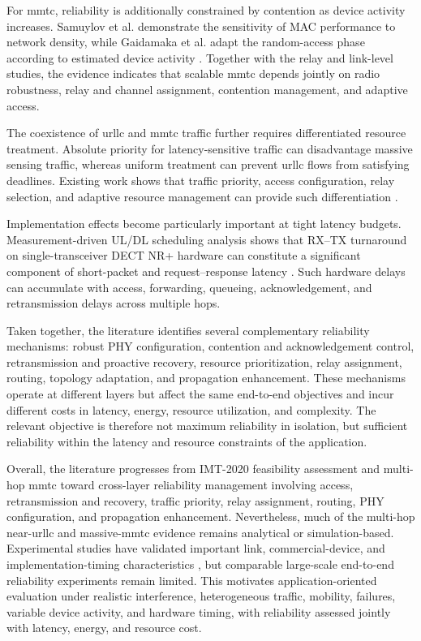 For \gls{mmtc}, reliability is additionally constrained by contention as
device activity increases. Samuylov et al. demonstrate the sensitivity of MAC
performance to network density, while Gaidamaka et al. adapt the random-access
phase according to estimated device activity
\cite{samuylovPerformanceMACLayer2024a,
gaidamakaOptimizingDelaysRandom2025}. Together with the relay and link-level
studies, the evidence indicates that scalable \gls{mmtc} depends jointly on
radio robustness, relay and channel assignment, contention management, and
adaptive access.

The coexistence of \gls{urllc} and \gls{mmtc} traffic further requires
differentiated resource treatment. Absolute priority for latency-sensitive
traffic can disadvantage massive sensing traffic, whereas uniform treatment
can prevent \gls{urllc} flows from satisfying deadlines. Existing work shows
that traffic priority, access configuration, relay selection, and adaptive
resource management can provide such differentiation
\cite{samuylovEmpoweringNearURLLCIoT2025,
glazkovImprovingNearURLLCServices2025,
singhwiDECT2020NewRadio2021}.

Implementation effects become particularly important at tight latency budgets.
Measurement-driven UL/DL scheduling analysis shows that RX--TX turnaround on
single-transceiver DECT NR+ hardware can constitute a significant component of
short-packet and request--response latency
\cite{alizaiMeasurementDrivenLatencyAnalysis2026}. Such hardware delays can
accumulate with access, forwarding, queueing, acknowledgement, and
retransmission delays across multiple hops.

Taken together, the literature identifies several complementary reliability
mechanisms: robust PHY configuration, contention and acknowledgement control,
retransmission and proactive recovery, resource prioritization, relay
assignment, routing, topology adaptation, and propagation enhancement. These
mechanisms operate at different layers but affect the same end-to-end
objectives and incur different costs in latency, energy, resource utilization,
and complexity. The relevant objective is therefore not maximum reliability
in isolation, but sufficient reliability within the latency and resource
constraints of the application.

Overall, the literature progresses from IMT-2020 feasibility assessment and
multi-hop \gls{mmtc} toward cross-layer reliability management involving
access, retransmission and recovery, traffic priority, relay assignment,
routing, PHY configuration, and propagation enhancement. Nevertheless, much
of the multi-hop near-\gls{urllc} and massive-\gls{mmtc} evidence remains
analytical or simulation-based. Experimental studies have validated important
link, commercial-device, and implementation-timing characteristics
\cite{haqueDECT2020NRLink2025,
bandaraExperimentalValidationAnalysis2025,
grafParetoOptimalityApproach2026a,
alizaiMeasurementDrivenLatencyAnalysis2026}, but comparable large-scale
end-to-end reliability experiments remain limited. This motivates
application-oriented evaluation under realistic interference, heterogeneous
traffic, mobility, failures, variable device activity, and hardware timing,
with reliability assessed jointly with latency, energy, and resource cost.


